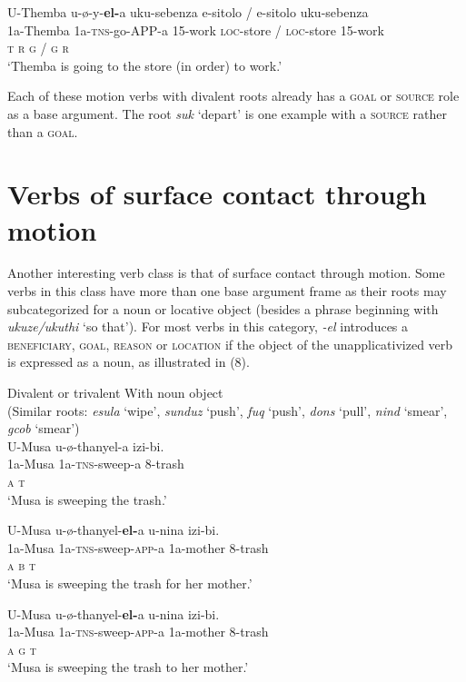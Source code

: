 \documentclass[output=paper]{langsci/langscibook}
\begin{document}
\ex
\gll U-Themba u-ø-y-\textbf{el-}a uku-sebenza e-sitolo / e-sitolo uku-sebenza \\
 1a-Themba 1a-\textsc{tns}-go-APP-a 15-work \textsc{loc}-store / \textsc{loc}-store 15-work\\
 \textsc{t r g / g r}\\
\glt ‘Themba is going to the store (in order) to work.’
\z
\z


Each of these motion verbs with divalent roots already has a \textsc{goal} or \textsc{source} role as a base argument. The root \textit{suk} ‘depart’ is one example with a \textsc{source} rather than a \textsc{goal}.

\section{Verbs of surface contact through motion}

Another interesting verb class is that of surface contact through motion. Some verbs in this class have more than one base argument frame as their roots may subcategorized for a noun or locative object (besides a phrase beginning with \textit{ukuze/ukuthi} ‘so that’). For most verbs in this category, \textit{-el} introduces a \textsc{beneficiary}, \textsc{goal}, \textsc{reason} or \textsc{location} if the object of the unapplicativized verb is expressed as a noun, as illustrated in (8). 

\ea
{Divalent or trivalent With noun object}\\
 (Similar roots: \textit{esula} ‘wipe’, \textit{sunduz} ‘push’, \textit{fuq} ‘push’, \textit{dons} ‘pull’, \textit{nind} ‘smear’, \textit{gcob} ‘smear’)\\
\ea
\gll U-Musa u-ø-thanyel-a izi-bi. \\
 1a-Musa 1a-\textsc{tns}-sweep-a 8-trash\\
 \textsc{a t}\\
\glt ‘Musa is sweeping the trash.’

\ex
\gll U-Musa u-ø-thanyel-\textbf{el-}a u-nina izi-bi. \\
 1a-Musa 1a-\textsc{tns}-sweep-\textsc{app}-a 1a-mother 8-trash\\
 \textsc{a b t}\\
\glt ‘Musa is sweeping the trash for her mother.’

\ex
\gll U-Musa u-ø-thanyel-\textbf{el-}a u-nina izi-bi. \\
 1a-Musa 1a-\textsc{tns}-sweep-\textsc{app}-a 1a-mother 8-trash\\
 \textsc{a g t}\\
\glt ‘Musa is sweeping the trash to her mother.’
\end{document}
